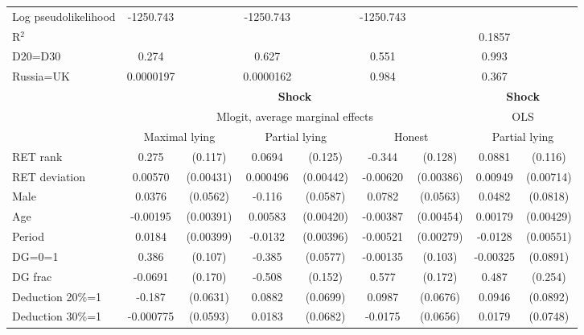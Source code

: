 \begin{tabular}{l|cccccc|cc}
Log pseudolikelihood  & -1250.743   &         &    -1250.743              &         &    -1250.743              &         &           &   \\ 
R$^2$      &                  &         &                  &         &                  &         &         0.1857  &   \\ 
D20=D30         &    0.274         &         &    0.627         &         &    0.551         &         &    0.993         &         \\
Russia=UK       &0.0000197         &         &0.0000162         &         &    0.984         &         &    0.367         &         \\
\hline\hline
&\multicolumn{6}{c|}{\bf Shock}&\multicolumn{2}{c}{\bf Shock}\\ &\multicolumn{6}{c|}{Mlogit, average marginal effects }&\multicolumn{2}{c}{OLS}\\
                &\multicolumn{2}{c}{Maximal lying}&\multicolumn{2}{c}{Partial lying}&\multicolumn{2}{c}{Honest}  &\multicolumn{2}{c}{Partial lying}\\
\hline
RET rank        &    0.275\sym{**} &  (0.117)&   0.0694         &  (0.125)&   -0.344\sym{***}&  (0.128)&   0.0881         &  (0.116)\\
RET deviation   &  0.00570         &(0.00431)& 0.000496         &(0.00442)& -0.00620         &(0.00386)&  0.00949         &(0.00714)\\
Male            &   0.0376         & (0.0562)&   -0.116\sym{**} & (0.0587)&   0.0782         & (0.0563)&   0.0482         & (0.0818)\\
Age             & -0.00195         &(0.00391)&  0.00583         &(0.00420)& -0.00387         &(0.00454)&  0.00179         &(0.00429)\\
Period          &   0.0184\sym{***}&(0.00399)&  -0.0132\sym{***}&(0.00396)& -0.00521\sym{*}  &(0.00279)&  -0.0128\sym{**} &(0.00551)\\
DG=0=1          &    0.386\sym{***}&  (0.107)&   -0.385\sym{***}& (0.0577)& -0.00135         &  (0.103)& -0.00325         & (0.0891)\\
DG frac         &  -0.0691         &  (0.170)&   -0.508\sym{***}&  (0.152)&    0.577\sym{***}&  (0.172)&    0.487\sym{*}  &  (0.254)\\
Deduction 20\%=1&   -0.187\sym{***}& (0.0631)&   0.0882         & (0.0699)&   0.0987         & (0.0676)&   0.0946         & (0.0892)\\
Deduction 30\%=1&-0.000775         & (0.0593)&   0.0183         & (0.0682)&  -0.0175         & (0.0656)&   0.0179         & (0.0748)\\

\end{tabular}
